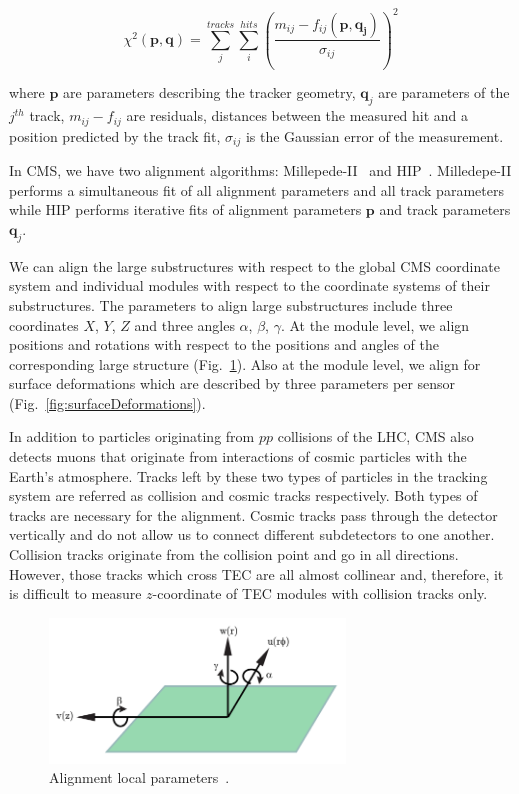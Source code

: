 \begin{equation}
  \chi^2(\mathbf{p},\mathbf{q})=\sum_j^{tracks} \sum_i^{hits} \left( {\frac{m_{ij}-f_{ij}(\mathbf{p},\mathbf{q_j})}{\sigma_{ij}}} \right)^2
\end{equation}

where $\mathbf{p}$ are parameters describing the tracker geometry, $\mathbf{q}_j$ are parameters of the $j^{th}$ track, $m_{ij}-f_{ij}$ are residuals, distances between the measured hit and a position predicted by the track fit, $\sigma_{ij}$ is the Gaussian error of the measurement.

In CMS, we have two alignment algorithms: Millepede-II~\cite{ref_MPII_Alg} and HIP~\cite{ref_HIP_Alg}. Milledepe-II performs a simultaneous fit of all alignment parameters and all track parameters while HIP performs iterative fits of alignment parameters $\mathbf{p}$ and track parameters $\mathbf{q}_j$.

We can align the large substructures with respect to the global CMS coordinate system and individual modules with respect to the coordinate systems of their substructures. The parameters to align large substructures include three coordinates $X$, $Y$, $Z$ and three angles $\alpha$, $\beta$, $\gamma$. At the module level, we align positions and rotations with respect to the positions and angles of the corresponding large structure (Fig.~\ref{fig:alignmentParameters}). Also at the module level, we align for surface deformations which are described by three parameters per sensor (Fig.~\ref{fig:surfaceDeformations}). 

In addition to particles originating from $pp$ collisions of the LHC, CMS also detects muons that originate from interactions of cosmic particles with the Earth's atmosphere. Tracks left by these two types of particles in the tracking system are referred as collision and cosmic tracks respectively. Both types of tracks are necessary for the alignment. Cosmic tracks pass through the detector vertically and do not allow us to connect different subdetectors to one another. Collision tracks originate from the collision point and go in all directions. However, those tracks which cross TEC are all almost collinear and, therefore, it is difficult to measure $z$-coordinate of TEC modules with collision tracks only.

\begin{figure}[htb]
    \begin{center}
        \includegraphics[width=0.70\textwidth]{../figs/Alignment/alignment_strip_coords.png}
    \end{center}
    \caption{Alignment local parameters~\cite{ref_Frank_thesis}.}
    \label{fig:alignmentParameters}
\end{figure}

